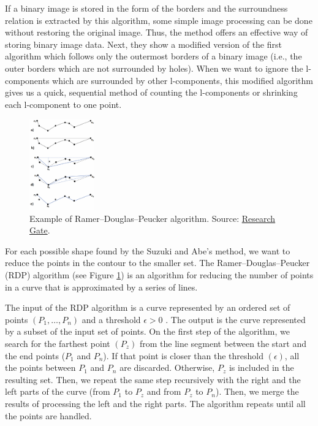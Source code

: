 \documentclass[]{IEEEtran}
\begin{document}
  If a binary image is stored in the form of the borders and the surroundness relation is extracted by this algorithm, some simple image processing can be done without restoring the original image. Thus, the method offers an effective way of storing binary image data. Next, they show a modified version of the first algorithm which follows only the outermost borders of a binary image (i.e., the outer borders which are not surrounded by holes). When we want to ignore the l-components which are surrounded by other l-components, this modified algorithm gives us a quick, sequential method of counting the l-components or shrinking each l-component to one point. 
  
   \begin{figure}[h]
   \centering
   \includegraphics[width=0.25\textwidth]{figures/rdp.png}
   \caption{\label{rdp} Example of Ramer–Douglas–Peucker algorithm. Source: \href{https://www.researchgate.net/figure/Input-curve-specified-stages-of-the-Ramer-Douglas-Peucker-algorithm-output-curve-with_fig1_236024099}{Research Gate}.}
  \end{figure}
  
  For each possible shape found by the Suzuki and Abe's method, we want to reduce the points in the contour to the smaller set. The Ramer–Douglas–Peucker (RDP) algorithm (see Figure \ref{rdp}) is an algorithm for reducing the number of points in a curve that is approximated by a series of lines. 
  
  The input of the RDP algorithm is a curve represented by an ordered set of points $(P_1,\dots,P_n)$ and a threshold $\epsilon > 0$ . The output is the curve represented by a subset of the input set of points. On the first step of the algorithm, we search for the farthest point $(P_z)$ from the line segment between the start and the end points ($P_1$ and $P_n$). If that point is closer than the threshold $(\epsilon)$, all the points between $P_1$ and $P_n$ are discarded. Otherwise, $P_z$ is included in the resulting set. Then, we repeat the same step recursively with the right and the left parts of the curve (from $P_1$ to $P_z$ and from $P_z$ to $P_n$). Then, we merge the results of processing the left and the right parts. The algorithm repeats until all the points are handled.
  
\end{document}
